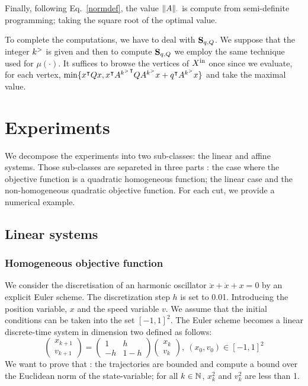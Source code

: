 \documentclass[10pt]{article}
\begin{document}
Finally, following Eq.~\eqref{normdef}, the value $\| A\|_\cdot$ is compute from semi-definite programming; taking the square root of the optimal value.

To complete the computations, we have to deal with $\mathbf{S}_{q,Q}$. We suppose that the integer $k^{>}$ is given and then to compute $\mathbf{S}_{q,Q}$ we employ the same technique used for $\mu(\cdot)$. It suffices to browse the vertices of $X^\mathrm{in}$ once since we evaluate, for each vertex, $\min\{x^\intercal Q x, x^\intercal {A^{k^{>}}}^\intercal Q {A^{k^{>}}}x+q^\intercal A^{k^{>}} x\}$ and take the maximal value. 
\section{Experiments}
\label{experiments}
We decompose the experiments into two sub-classes: the linear and affine systems. Those sub-classes are separeted in three parts : the  case where the objective function is a quadratic homogeneous function; the linear case and the non-homogeneous quadratic objective function. For each cut, we provide a numerical example.  
\subsection{Linear systems}

\subsubsection{Homogeneous objective function}
\label{exp-linear}
We consider the discretisation of an harmonic oscillator $\ddot{x}+\dot{x}+x=0$ by an explicit Euler scheme. The discretization step $h$ is set to 0.01. Introducing the position variable, $x$ and the speed variable $v$. We assume that the initial conditions can be taken into the set $[-1,1]^2$. The Euler scheme becomes a linear discrete-time system in dimension two defined as follows: 
\[
\begin{pmatrix}
x_{k+1}\\
v_{k+1}
\end{pmatrix}
=\begin{pmatrix}
1 & h\\
-h & 1-h
\end{pmatrix}
\begin{pmatrix}
x_{k}\\
v_{k}
\end{pmatrix},\ (x_0,v_0)\in [-1,1]^2
\]
We want to prove that :
the trajectories are bounded and compute a bound over the Euclidean norm of the state-variable; for all $k\in\mathbb{N}$, $x_{k}^2$ and $v_{k}^2$ are less than 1.
 
\end{document}
